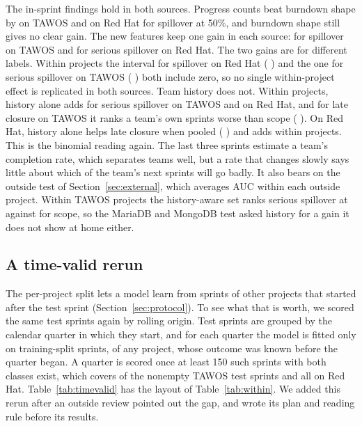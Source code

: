 The in-sprint findings hold in both sources. Progress counts beat burndown shape by \dIWWkSpB{} \cIWWkSpB{} on TAWOS and \dIYWkSpB{} \cIYWkSpB{} on Red Hat for spillover at 50\%, and burndown shape still gives no clear gain. The new features keep one gain in each source: \dPWNewSp{} \cPWNewSp{} for spillover on TAWOS and \dPYNewSs{} \cPYNewSs{} for serious spillover on Red Hat. The two gains are for different labels. Within projects the interval for spillover on Red Hat (\dPYNewSp{} \cPYNewSp) and the one for serious spillover on TAWOS (\dPWNewSs{} \cPWNewSs) both include zero, so no single within-project effect is replicated in both sources. Team history does not. Within projects, history alone adds \dPWStrSs{} \cPWStrSs{} for serious spillover on TAWOS and \dPYStrSs{} \cPYStrSs{} on Red Hat, and for late closure on TAWOS it ranks a team's own sprints worse than scope (\dPWStrLc{} \cPWStrLc). On Red Hat, history alone helps late closure when pooled (\dPXStrLc{} \cPXStrLc) and adds \dPYStrLc{} within projects. This is the binomial reading again. The last three sprints estimate a team's completion rate, which separates teams well, but a rate that changes slowly says little about which of the team's next sprints will go badly. It also bears on the outside test of Section~\ref{sec:external}, which averages AUC within each outside project. Within TAWOS projects the history-aware set ranks serious spillover at \wPTSsNew{} against \wPTSsScope{} for scope, so the MariaDB and MongoDB test asked history for a gain it does not show at home either.

\subsection{A time-valid rerun}
\label{sec:timevalid}

The per-project split lets a model learn from sprints of other projects that started after the test sprint (Section~\ref{sec:protocol}). To see what that is worth, we scored the same test sprints again by rolling origin. Test sprints are grouped by the calendar quarter in which they start, and for each quarter the model is fitted only on training-split sprints, of any project, whose outcome was known before the quarter began. A quarter is scored once at least 150 such sprints with both classes exist, which covers \TvNT{} of the \TvNallT{} nonempty TAWOS test sprints and all \TvNallR{} on Red Hat. Table~\ref{tab:timevalid} has the layout of Table~\ref{tab:within}. We added this rerun after an outside review pointed out the gap, and wrote its plan and reading rule before its results.

